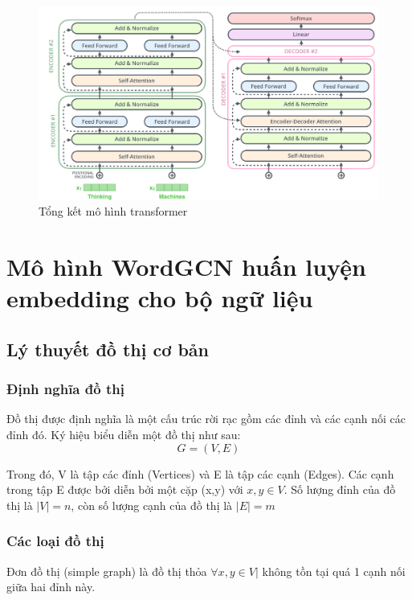 \begin{figure}[H]
    \begin{center}
        \includegraphics[scale=0.3]{images/transformer_sumary}
        \caption{Tổng kết mô hình transformer}
        \label{fig:transformer-summary}
    \end{center}
\end{figure}


\section{Mô hình WordGCN huấn luyện embedding cho bộ ngữ liệu}

\subsection{Lý thuyết đồ thị cơ bản}

\subsubsection{Định nghĩa đồ thị}

Đồ thị được định nghĩa là một cấu trúc rời rạc gồm các đỉnh và các cạnh nối các đỉnh đó. Ký hiệu biểu diễn một đồ thị như sau:
\begin{equation*}
	G = (V,E)
\end{equation*}

Trong đó, V là tập các đỉnh (Vertices) và E là tập các cạnh (Edges). Các cạnh trong tập E được bởi diễn bởi một cặp (x,y) với $x,y \in V$. Số lượng đỉnh của đồ thị là $|V| = n$, còn số lượng cạnh của đồ thị là $|E| = m$

\subsubsection{Các loại đồ thị}
Đơn đồ thị (simple graph) là đồ thị thỏa $\forall x,y \in V | $ không tồn tại quá 1 cạnh nối giữa hai đỉnh này.

